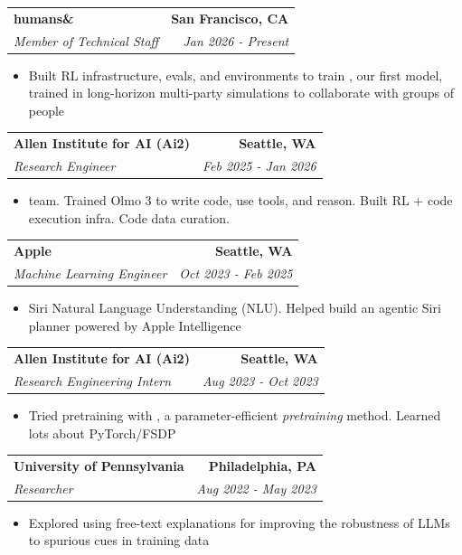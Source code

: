 \documentclass[letterpaper,11pt]{article}
\makeatletter
\newcommand{\betterHref}[2]{\href{#1}{\color{violetpurple}{#2}}}
\newcommand{\resumeItem}[1]{
  \item\small{
    {#1 \vspace{-3pt}}
  }
}
\newcommand{\resumeSubheading}[4]{
  \vspace{-3pt}\item
    \begin{tabular*}{1.0\textwidth}[t]{l@{\extracolsep{\fill}}r}
      \textbf{#1} & \textbf{\small #2} \\
      \textit{\small#3} & \textit{\small #4} \\
    \end{tabular*}\vspace{-7pt}
}
\newcommand{\resumeItemListStart}{\begin{itemize}[itemsep=0pt]}
\newcommand{\resumeItemListEnd}{\end{itemize}\vspace{0pt}}
\makeatother
\begin{document}
    \resumeSubheading
        {humans\&}{San Francisco, CA}
            {Member of Technical Staff}{Jan 2026 - Present}
            \resumeItemListStart
                \resumeItem{Built RL infrastructure, evals, and environments to train \betterHref{https://ampersand.humansand.ai/blog/}{Ampersand}, our first model, trained in long-horizon multi-party simulations to collaborate with groups of people}
            \resumeItemListEnd

    \resumeSubheading
        {Allen Institute for AI (Ai2)}{Seattle, WA}
            {Research Engineer \betterHref{https://arxiv.org/abs/2512.13961}{(paper)}}{Feb 2025 - Jan 2026}
            \resumeItemListStart
                \resumeItem{\betterHref{https://allenai.org/olmo}{Olmo} team. Trained Olmo 3 to write code, use tools, and reason. Built RL + code execution infra. Code data curation.}
            \resumeItemListEnd
    
        \resumeSubheading
        {Apple}{Seattle, WA}
            {Machine Learning Engineer}{Oct 2023 - Feb 2025}
            \resumeItemListStart
                \resumeItem{Siri Natural Language Understanding (NLU). Helped build an agentic Siri planner powered by Apple Intelligence}
            \resumeItemListEnd

        \resumeSubheading
        {Allen Institute for AI (Ai2)}{Seattle, WA}
            {Research Engineering Intern \betterHref{https://arxiv.org/abs/2402.00838}{(paper)}}{Aug 2023 - Oct 2023}
            \resumeItemListStart
                \resumeItem{Tried pretraining \betterHref{https://allenai.org/olmo}{Olmo} with \betterHref{https://arxiv.org/abs/2307.05695}{ReLoRA}, a parameter-efficient \textit{pretraining} method. Learned lots about PyTorch/FSDP}
            \resumeItemListEnd
        \resumeSubheading
        {University of Pennsylvania}{Philadelphia, PA}
            {Researcher \betterHref{https://arxiv.org/abs/2305.04990}{(paper)} \betterHref{https://www.youtube.com/watch?v=I0P5XbYqGq0\&ab_channel=SaurabhShah}{(talk)}}{Aug 2022 - May 2023}
            \resumeItemListStart
                \resumeItem{Explored using free-text explanations for improving the robustness of LLMs to spurious cues in training data}
            \resumeItemListEnd
            
\end{document}
